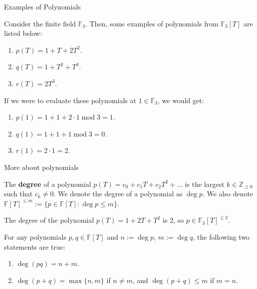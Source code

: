\documentclass{zkdl-presentation-template}
\begin{document}
    \begin{frame}{Examples of Polynomials}
      \begin{example}
        Consider the finite field $\mathbb{F}_3$. Then, some examples of polynomials from $\mathbb{F}_3[T]$ are listed below:
        \begin{enumerate}
            \item $p(T) = 1 + T + 2T^2$.
            \item $q(T) = 1 + T^2 + T^3$.
            \item $r(T) = 2T^3$.
        \end{enumerate}
        \pause

        If we were to evaluate these polynomials at $1 \in \mathbb{F}_3$, we would get:
        \begin{enumerate}
            \item $p(1) = 1 + 1 + 2 \cdot 1 \; \text{mod} \; 3 = 1$.
            \item $q(1) = 1 + 1 + 1 \; \text{mod} \; 3 = 0$.
            \item $r(1) = 2 \cdot 1 = 2$.
        \end{enumerate}
      \end{example}
    \end{frame}

    \begin{frame}{More about polynomials}
      \begin{definition}
          The \textbf{degree} of a polynomial $p(T) = c_0+c_1T+c_2T^2+\dots$ is the largest $k \in \mathbb{Z}_{\geq 0}$ such that $c_k \neq 0$. We denote the degree of a polynomial as $\deg p$. We also denote $\mathbb{F}[T]^{\leq m} := \{p \in \mathbb{F}[T]: \deg p \leq m\}$.
      \end{definition}
      \pause

      \begin{example}
          The degree of the polynomial $p(T) = 1 + 2T + T^2$ is $2$, so $p \in \mathbb{F}_3[T]^{\leq 2}$.
      \end{example}
      \pause

      \begin{theorem}
          For any polynomials $p,q \in \mathbb{F}[T]$ and $n := \deg p$, $m := \deg q$, the following two statements are true:
          \begin{enumerate}
              \item $\deg (pq) = n + m$.
              \item $\deg (p + q) = \max\{n,m\}$ if $n \neq m$, and $\deg (p+q) \leq m$ if $m=n$.
          \end{enumerate}
      \end{theorem}
    \end{frame}
\end{document}
